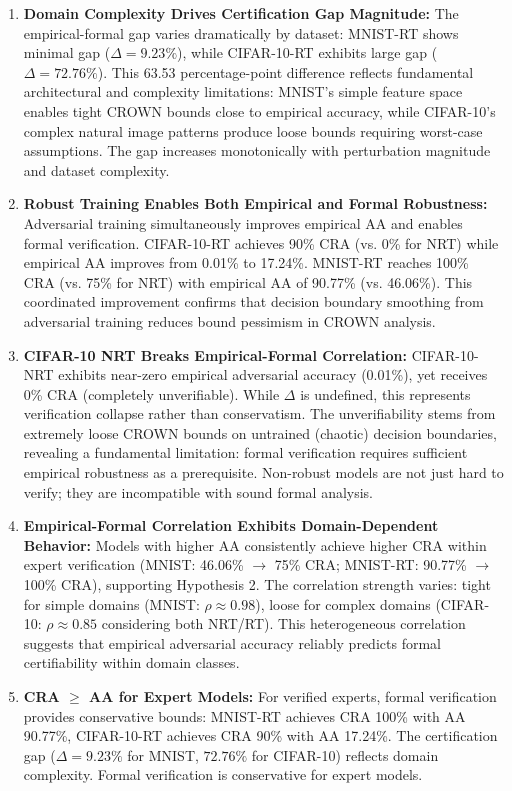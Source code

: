 \documentclass[11pt,a4paper]{article}
\begin{document}
\begin{enumerate}
    \item \textbf{Domain Complexity Drives Certification Gap Magnitude:} The empirical-formal gap varies dramatically by dataset: MNIST-RT shows minimal gap ($\Delta = 9.23\%$), while CIFAR-10-RT exhibits large gap ($\Delta = 72.76\%$). This 63.53 percentage-point difference reflects fundamental architectural and complexity limitations: MNIST's simple feature space enables tight CROWN bounds close to empirical accuracy, while CIFAR-10's complex natural image patterns produce loose bounds requiring worst-case assumptions. The gap increases monotonically with perturbation magnitude and dataset complexity.

    \item \textbf{Robust Training Enables Both Empirical and Formal Robustness:} Adversarial training simultaneously improves empirical AA and enables formal verification. CIFAR-10-RT achieves 90\% CRA (vs. 0\% for NRT) while empirical AA improves from 0.01\% to 17.24\%. MNIST-RT reaches 100\% CRA (vs. 75\% for NRT) with empirical AA of 90.77\% (vs. 46.06\%). This coordinated improvement confirms that decision boundary smoothing from adversarial training reduces bound pessimism in CROWN analysis.

    \item \textbf{CIFAR-10 NRT Breaks Empirical-Formal Correlation:} CIFAR-10-NRT exhibits near-zero empirical adversarial accuracy (0.01\%), yet receives 0\% CRA (completely unverifiable). While $\Delta$ is undefined, this represents verification collapse rather than conservatism. The unverifiability stems from extremely loose CROWN bounds on untrained (chaotic) decision boundaries, revealing a fundamental limitation: formal verification requires sufficient empirical robustness as a prerequisite. Non-robust models are not just hard to verify; they are incompatible with sound formal analysis.

    \item \textbf{Empirical-Formal Correlation Exhibits Domain-Dependent Behavior:} Models with higher AA consistently achieve higher CRA within expert verification (MNIST: 46.06\% $\to$ 75\% CRA; MNIST-RT: 90.77\% $\to$ 100\% CRA), supporting Hypothesis 2. The correlation strength varies: tight for simple domains (MNIST: $\rho \approx 0.98$), loose for complex domains (CIFAR-10: $\rho \approx 0.85$ considering both NRT/RT). This heterogeneous correlation suggests that empirical adversarial accuracy reliably predicts formal certifiability within domain classes.

    \item \textbf{CRA $\geq$ AA for Expert Models:} For verified experts, formal verification provides conservative bounds: MNIST-RT achieves CRA 100\% with AA 90.77\%, CIFAR-10-RT achieves CRA 90\% with AA 17.24\%. The certification gap ($\Delta = 9.23\%$ for MNIST, $72.76\%$ for CIFAR-10) reflects domain complexity. Formal verification is conservative for expert models.
\end{enumerate}
\end{document}
